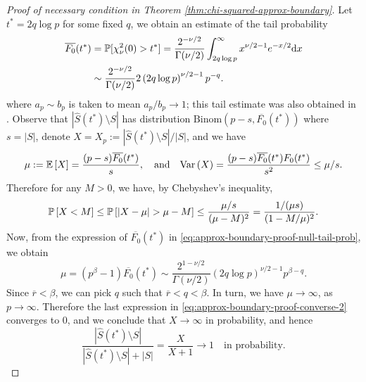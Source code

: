\begin{proof}[Proof of necessary condition in Theorem \ref{thm:chi-squared-approx-boundary}]
Let $t^* = 2q\log{p}$ for some fixed $q$, we obtain an estimate of the tail probability
\begin{align}
    \overline{F_0}(t^*) 
    &= \P[\chi_\nu^2(0) > t^*] 
    = \frac{2^{-\nu/2}}{\Gamma(\nu/2)} \int_{2q\log{p}}^\infty x^{\nu/2-1}e^{-x/2} \mathrm{d}x \nonumber \\
    &\sim \frac{2^{-\nu/2}}{\Gamma(\nu/2)} 2\left(2q\log{p}\right)^{\nu/2-1}p^{-q}. \label{eq:approx-boundary-proof-null-tail-prob}
\end{align}
where $a_p\sim b_p$ is taken to mean $a_p/b_p\to 1$; this tail estimate was also obtained in \cite{donoho2004higher}.
Observe that $|\widehat{S}(t^*)\setminus{S}|$ has distribution $\text{Binom}(p-s, \overline{F_0}(t^*))$ where $s=|S|$, denote $X = X_p := {|\widehat{S}(t^*)\setminus{S}|}/{|S|}$, and we have 
$$
\mu := {\mathbb E}\left[X\right] = \frac{(p-s)\overline{F_0}(t^*)}{s},
\quad \text{and} \quad
{\rm {Var}}\left(X\right) = \frac{(p-s)\overline{F_0}(t^*){F_0}(t^*)}{s^2} \le \mu/s.
$$
Therefore for any $M>0$, we have, by Chebyshev's inequality,
\begin{equation}
    \P\left[X < M\right] 
    \le \P\left[\left|X-\mu\right| > \mu - M\right]
    \le \frac{\mu/s}{(\mu-M)^2}
    = \frac{1/(\mu s)}{(1-M/\mu)^2}. \label{eq:approx-boundary-proof-converse-2}
\end{equation}
Now, from the expression of $\overline{F_0}(t^*)$ in \eqref{eq:approx-boundary-proof-null-tail-prob}, we obtain
$$
\mu = (p^\beta - 1)\overline{F_0}(t^*) \sim \frac{2^{1-\nu/2}}{\Gamma(\nu/2)} \left(2q\log{p}\right)^{\nu/2-1}p^{\beta-q}.
$$
Since $\overline{r}<\beta$, we can pick $q$ such that $\overline{r}<q<\beta$. 
In turn, we have $\mu \to\infty$, as $p\to\infty$.
Therefore the last expression in \eqref{eq:approx-boundary-proof-converse-2} converges to 0, and we conclude that $X\to\infty$ in probability, and hence
\begin{equation} \label{eq:approx-boundary-proof-converse-3}
\frac{|\widehat{S}(t^*)\setminus{S}|}{|\widehat{S}(t^*)\setminus{S}|+|{S}|} 
= \frac{X}{X+1} \to 1 \quad \text{in probability}.
\end{equation}


\end{proof}
